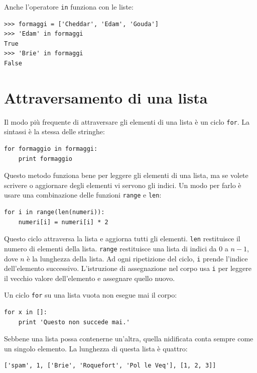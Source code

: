 \documentclass[10pt]{book}
\begin{document}
Anche l'operatore {\tt in} funziona con le liste:

\begin{verbatim}
>>> formaggi = ['Cheddar', 'Edam', 'Gouda']
>>> 'Edam' in formaggi
True
>>> 'Brie' in formaggi
False
\end{verbatim}


\section{Attraversamento di una lista}

Il modo più frequente di attraversare gli elementi di una lista è un ciclo {\tt for}. La sintassi è la stessa delle stringhe:

\begin{verbatim}
for formaggio in formaggi:
    print formaggio
\end{verbatim}
%
Questo metodo funziona bene per leggere gli elementi di una lista, ma se volete scrivere o aggiornare degli elementi vi servono gli indici. Un modo per farlo è usare una combinazione delle funzioni {\tt range} e {\tt len}:

\begin{verbatim}
for i in range(len(numeri)):
    numeri[i] = numeri[i] * 2
\end{verbatim}
%
Questo ciclo attraversa la lista e aggiorna tutti gli elementi. {\tt len}
restituisce il numero di elementi della lista.  {\tt range} restituisce una lista di indici da 0 a $n-1$, dove $n$ è la lunghezza della lista. Ad ogni ripetizione del ciclo, {\tt i} prende l'indice dell'elemento successivo. L'istruzione di assegnazione nel corpo usa {\tt i} per leggere il vecchio valore dell'elemento e assegnare quello nuovo.

Un ciclo {\tt for} su una lista vuota non esegue mai il corpo:

\begin{verbatim}
for x in []:
    print 'Questo non succede mai.'
\end{verbatim}
%
Sebbene una lista possa contenerne un'altra, quella nidificata conta sempre come un singolo elemento. La lunghezza di questa lista è quattro:

\begin{verbatim}
['spam', 1, ['Brie', 'Roquefort', 'Pol le Veq'], [1, 2, 3]]
\end{verbatim}
\end{document}
